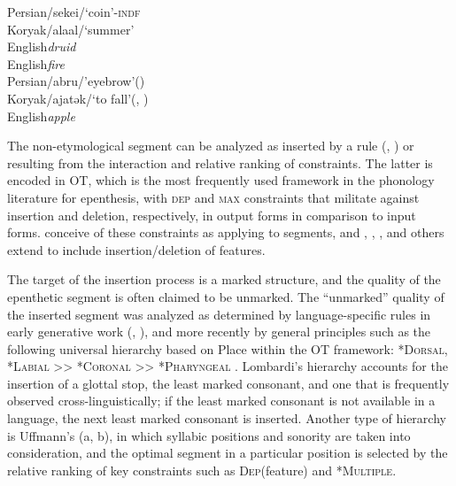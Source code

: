 \documentclass[output=paper,colorlinks,citecolor=brown]{langscibook}
\begin{document}
\begin{exe}
		\ex
			\begin{xlist}
				\ex \label{mor}  Persian\tab  /sekei/\tab [sekeʔi]\tab   ‘coin’-\textsc{indf}\tab \citep{Moradi2017}\\
				    Koryak\tab  /alaal/\tab [alaʔal]\tab ‘summer’\tab \tab \citep{Kurebito2004}\\
                    English\tab  \textit{druid}\tab [dɹuwɪd]\\
                    English\tab \textit{fire}\tab [fajəɹ]\\

                    \ex \label{rhys} Persian\tab /abru/\tab [ʔabru]\tab 'eyebrow'\tab (\citealt{DehghanKambuziya2012})\\
                    Koryak\tab /ajatək/\tab [ʔajatək]\tab ‘to fall’\tab (\citealt{Kenstowicz1976}, \citealt{Lombardi2002})\\
                    English\tab \textit{apple}\tab [ʔæpəl]
			\end{xlist}
	\end{exe}

The non-etymological segment can be analyzed as inserted by a rule (\citealt{Zwicky1972}, \citealt{Dinnsen1980}) or resulting from the interaction and relative ranking of constraints. The latter is encoded in OT, which is the most frequently used framework in the phonology literature for epenthesis, with \textsc{dep} and \textsc{max} constraints that militate against insertion and deletion, respectively, in output forms in comparison to input forms. \citet{McCarthyPrince1995} conceive of these constraints as applying to segments, and \citet{Lombardi1998}, \citet{Krämer2001}, , and others extend to include insertion/deletion of features.

The target of the insertion process is a marked structure, and the quality of the epenthetic segment is often claimed to be unmarked. The “unmarked” quality of the inserted segment was analyzed as determined by language-specific rules in early generative work (\citealt{Zwicky1972}, \citealt{Dinnsen1980}), and more recently by general principles such as the following universal hierarchy based on Place within the OT framework: \textsc{*Dorsal, *Labial >> *Coronal >> *Pharyngeal} \citep{Lombardi2002}. Lombardi’s hierarchy accounts for the insertion of a glottal stop, the least marked consonant, and one that is frequently observed cross-linguistically; if the least marked consonant is not available in a language, the next least marked consonant is inserted. Another type of hierarchy is Uffmann’s (\citeyear{Uffmann2007a}a, \citeyear{Uffman2007b}b), in which syllabic positions and sonority are taken into consideration, and the optimal segment in a particular position is selected by the relative ranking of key constraints such as \textsc{Dep}(feature) and \textsc{*Multiple}. 
\end{document}
